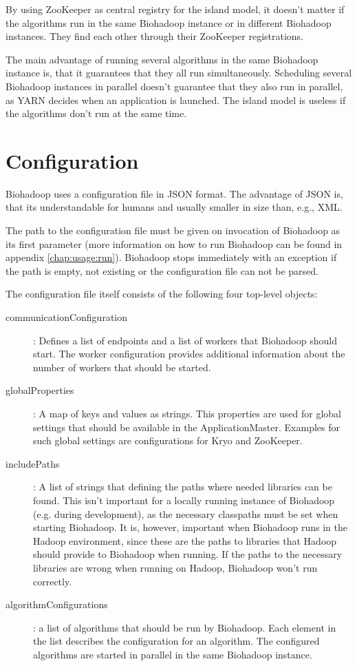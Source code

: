 By using ZooKeeper as central registry for the island model, it doesn't matter if the algorithms run in the same Biohadoop instance or in different Biohadoop instances. They find each other through their ZooKeeper registrations.

The main advantage of running several algorithms in the same Biohadoop instance is, that it guarantees that they all run simultaneously. Scheduling several Biohadoop instances in parallel doesn't guarantee that they also run in parallel, as YARN decides when an application is launched. The island model is useless if the algorithms don't run at the same time.

\section{Configuration}
\label{chap:impl:configuration}
Biohadoop uses a configuration file in JSON format. The advantage of JSON is, that its understandable for humans and usually smaller in size than, e.g., XML.

The path to the configuration file must be given on invocation of Biohadoop as its first parameter (more information on how to run Biohadoop can be found in appendix \ref{chap:usage:run}). Biohadoop stops immediately with an exception if the path is empty, not existing or the configuration file can not be parsed.

The configuration file itself consists of the following four top-level objects:
\begin{description}
  \item[communicationConfiguration]: Defines a list of endpoints and a list of workers that Biohadoop should start. The worker configuration provides additional information about the number of workers that should be started.
  \item[globalProperties]: A map of keys and values as strings. This properties are used for global settings that should be available in the ApplicationMaster. Examples for such global settings are configurations for Kryo and ZooKeeper.
  \item[includePaths]: A list of strings that defining the paths where needed libraries can be found. This isn't important for a locally running instance of Biohadoop (e.g. during development), as the necessary classpaths must be set when starting Biohadoop. It is, however, important when Biohadoop runs in the Hadoop environment, since these are the paths to libraries that Hadoop should provide to Biohadoop when running. If the paths to the necessary libraries are wrong when running on Hadoop, Biohadoop won't run correctly.
  \item[algorithmConfigurations]: a list of algorithms that should be run by Biohadoop. Each element in the list describes the configuration for an algorithm. The configured algorithms are started in parallel in the same Biohadoop instance.
\end{description}

